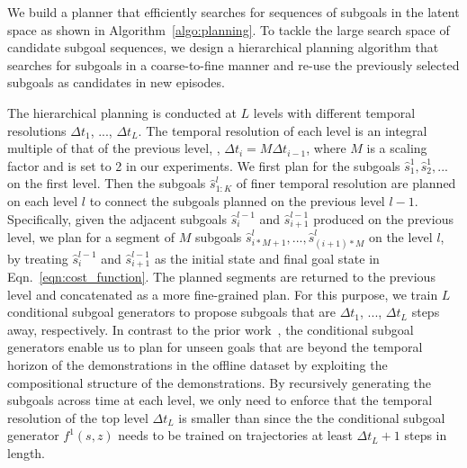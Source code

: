 We build a planner that efficiently searches for sequences of subgoals in the latent space as shown in Algorithm~\ref{algo:planning}. To tackle the large search space of candidate subgoal sequences, we design a hierarchical planning algorithm that searches for subgoals in a coarse-to-fine manner and re-use the previously selected subgoals as candidates in new episodes.

The hierarchical planning is conducted at $L$ levels with different temporal resolutions $\Delta t_1$, ..., $\Delta t_L$. The temporal resolution of each level is an integral multiple of that of the previous level, \ie, $\Delta t_i = M \Delta t_{i - 1}$, where $M$ is a scaling factor and is set to 2 in our experiments. We first plan for the subgoals $\hat{s}_1^1, \hat{s}_2^1, ...$ on the first level. Then the subgoals $\hat{s}_{1:K}^l$ of finer temporal resolution are planned on each level $l$ to connect the subgoals planned on the previous level $l-1$. Specifically, given the adjacent subgoals $\hat{s}_i^{l-1}$ and $\hat{s}_{i+1}^{l-1}$ produced on the previous level, we plan for a segment of  $M$ subgoals $\hat{s}_{i * M + 1}^{l}, ..., \hat{s}_{(i+1) * M}^{l}$ on the level $l$, by treating $\hat{s}_i^{l-1}$ and $\hat{s}_{i+1}^{l-1}$ as the initial state and final goal state in Eqn.~\ref{eqn:cost_function}. The planned segments are returned to the previous level and concatenated as a more fine-grained plan. For this purpose, we train $L$ conditional subgoal generators to propose subgoals that are $\Delta t_1$, ..., $\Delta t_L$ steps away, respectively. In contrast to the prior work~\cite{Pertsch2020LongHorizonVP}, the conditional subgoal generators enable us to plan for unseen goals that are beyond the temporal horizon of the demonstrations in the offline dataset by exploiting the compositional structure of the demonstrations. By recursively generating the subgoals across time at each level, we only need to enforce that the temporal resolution of the top level $\Delta t_L$ is smaller than since the the conditional subgoal generator $f^{1}(s, z)$ needs to be trained on trajectories at least $\Delta t_L + 1$ steps in length. 

